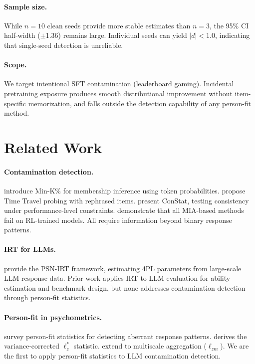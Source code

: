 \documentclass[11pt,a4paper]{article}
\begin{document}
\paragraph{Sample size.}
While $n=10$ clean seeds provide more stable estimates than $n=3$, the 95\% CI half-width ($\pm$1.36) remains large.
Individual seeds can yield $|d|<1.0$, indicating that single-seed detection is unreliable.

\paragraph{Scope.}
We target intentional SFT contamination (leaderboard gaming).
Incidental pretraining exposure produces smooth distributional improvement without item-specific memorization, and falls outside the detection capability of any person-fit method.

\section{Related Work}
\label{sec:related}

\paragraph{Contamination detection.}
\citet{shi2024detecting} introduce Min-K\% for membership inference using token probabilities.
\citet{dekoninck2024evading} propose Time Travel probing with rephrased items.
\citet{dekoninck2024constat} present ConStat, testing consistency under performance-level constraints.
\citet{wang2025rlmia} demonstrate that all MIA-based methods fail on RL-trained models.
All require information beyond binary response patterns.

\paragraph{IRT for LLMs.}
\citet{psnirt2026} provide the PSN-IRT framework, estimating 4PL parameters from large-scale LLM response data.
Prior work applies IRT to LLM evaluation for ability estimation and benchmark design, but none addresses contamination detection through person-fit statistics.

\paragraph{Person-fit in psychometrics.}
\citet{meijer1996personfit} survey person-fit statistics for detecting aberrant response patterns.
\citet{snijders2001} derives the variance-corrected $\ell_z^{*}$ statistic.
\citet{hong2021multiscale} extend to multiscale aggregation ($\ell_{zm}$).
We are the first to apply person-fit statistics to LLM contamination detection.
\end{document}
